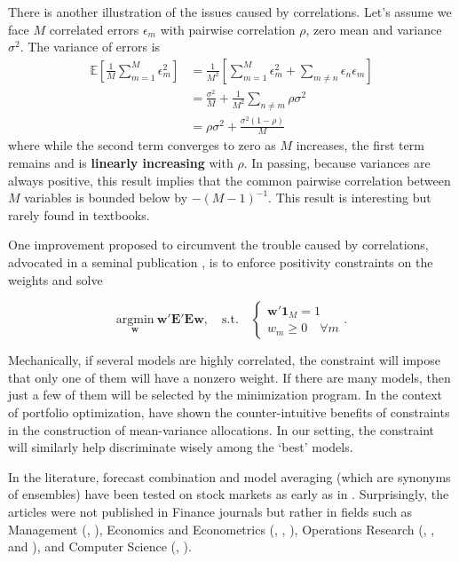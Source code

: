 There is another illustration of the issues caused by correlations. Let's assume we face $M$ correlated errors $\epsilon_m$ with pairwise correlation $\rho$, zero mean and variance $\sigma^2$. The variance of errors is
\begin{align*}
\mathbb{E}\left[\frac{1}{M}\sum_{m=1}^M \epsilon_m^2 \right]&=\frac{1}{M^2}\left[\sum_{m=1}^M\epsilon_m^2+\sum_{m\neq n}\epsilon_n\epsilon_m\right] \\
&=\frac{\sigma^2}{M}+\frac{1}{M^2}\sum_{n\neq m} \rho \sigma^2 \\
& =\rho \sigma^2 +\frac{\sigma^2(1-\rho)}{M}
\end{align*}
where while the second term converges to zero as $M$ increases, the first term remains and is \textbf{linearly increasing} with $\rho$. In passing, because variances are always positive, this result implies that the common pairwise correlation between $M$ variables is bounded below by $-(M -1)^{ -1}$. This result is interesting but rarely found in textbooks.

One improvement proposed to circumvent the trouble caused by correlations, advocated in a seminal publication \citep{breiman1996stacked}, is to enforce positivity constraints on the weights and solve

\begin{equation}
\underset{\textbf{w}}{\text{argmin}} \ \textbf{w}'\textbf{E}'\textbf{E}\textbf{w} , \quad \text{s.t.} \quad \left\{ 
\begin{array}{l} \textbf{w}'\textbf{1}_M=1 \\ w_m \ge 0 \quad \forall m \end{array}\right. .
\end{equation}

Mechanically, if several models are highly correlated, the constraint will impose that only one of them will have a nonzero weight. If there are many models, then just a few of them will be selected by the minimization program. In the context of portfolio optimization, \cite{jagannathan2003risk} have shown the counter-intuitive benefits of constraints in the construction of mean-variance allocations. In our setting, the constraint will similarly help discriminate wisely among the `best' models.

In the literature, forecast combination and model averaging (which are synonyms of ensembles) have been tested on stock markets as early as in \cite{von1972probabilistic}. Surprisingly, the articles were not published in Finance journals but rather in fields such as Management (\cite{virtanen1987forecasting}, \cite{wang2012stock}), Economics and Econometrics (\cite{donaldson1996forecast}, \cite{clark2009improving}, \cite{mascio2020market}), Operations Research (\cite{huang2005forecasting}, \cite{leung2001using}, and \cite{bonaccolto2019developing}), and Computer Science (\cite{harrald1997evolving}, \cite{hassan2007fusion}).

